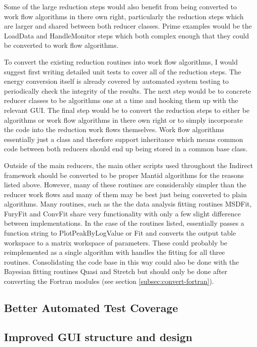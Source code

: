 \documentclass[paper=a4, fontsize=11pt]{scrartcl}	%
\numberwithin{equation}{section}															%
\numberwithin{figure}{section}																%
\numberwithin{table}{section}																%
\begin{document}
Some of the large reduction steps would also benefit from being converted to work flow algorithms in there own right, particularly the reduction steps which are larger and shared between both reducer classes. Prime examples would be the LoadData and HandleMonitor steps which both complex enough that they could be converted to work flow algorithms.

To convert the existing reduction routines into work flow algorithms, I would suggest first writing detailed unit tests to cover all of the reduction steps. The energy conversion itself is already covered by automated system testing to periodically check the integrity of the results. The next step would be to concrete reducer classes to be algorithms one at a time and hooking them up with the relevant GUI. The final step would be to convert the reduction steps to either be algorithms or work flow algorithms in there own right or to simply incorporate the code into the reduction work flows themselves. Work flow algorithms essentially just a class and therefore support inheritance which means common code between both reducers should end up being stored in a common base class.

Outside of the main reducers, the main other scripts used throughout the Indirect framework should be converted to be proper Mantid algorithms for the reasons listed above. However, many of these routines are considerably simpler than the reducer work flows and many of them may be best just being converted to plain algorithms. Many routines, such as the the data analysis fitting routines MSDFit, FuryFit and ConvFit share very functionality with only a few slight difference between implementations. In the case of the routines listed, essentially passes a function string to PlotPeakByLogValue or Fit and converts the output table workspace to a matrix workspace of parameters. These could probably be reimplemented as a single algorithm with handles the fitting for all three routines. Consolidating the code base in this way could also be done with the Bayesian fitting routines Quasi and Stretch but should only be done after converting the Fortran modules (see section \ref{subsec:convert-fortran}).

\subsection{Better Automated Test Coverage}


\subsection{Improved GUI structure and design}
\label{subsec:GUI-Improvements}
\end{document}

